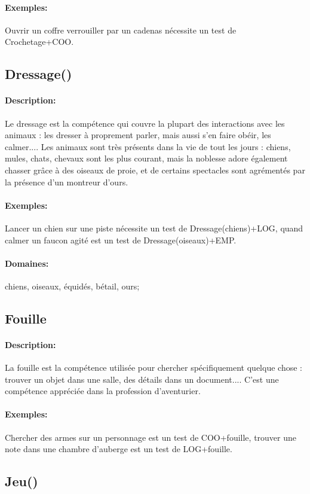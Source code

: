 \documentclass[10pt,a4paper,twocolumn]{book}
\begin{document}
\paragraph{Exemples:}Ouvrir un coffre verrouiller par un cadenas nécessite un test de Crochetage+COO.
\subsection{Dressage()}
\paragraph{Description:}Le dressage est la compétence qui couvre la plupart des interactions avec les animaux : les dresser à proprement parler, mais aussi s'en faire obéir, les calmer.... Les animaux sont très présents dans la vie de tout les jours : chiens, mules, chats, chevaux sont les plus courant, mais la noblesse adore également chasser grâce à des oiseaux de proie, et de certains spectacles sont agrémentés par la présence d'un montreur d'ours.
\paragraph{Exemples:}Lancer un chien sur une piste nécessite un test de Dressage(chiens)+LOG, quand calmer un faucon agité est un test de Dressage(oiseaux)+EMP.
\paragraph{Domaines:}chiens, oiseaux, équidés, bétail, ours;
\subsection{Fouille}
\paragraph{Description:}La fouille est la compétence utilisée pour chercher spécifiquement quelque chose : trouver un objet dans une salle, des détails dans un document.... C'est une compétence appréciée dans la profession d'aventurier.
\paragraph{Exemples:}Chercher des armes sur un personnage est un test de COO+fouille, trouver une note dans une chambre d'auberge est un test de LOG+fouille. 
\subsection{Jeu()}
\end{document}
